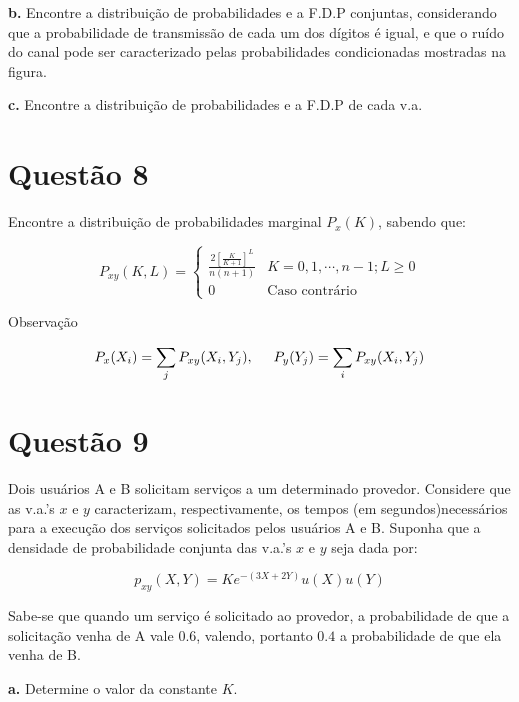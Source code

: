 \documentclass[a5paper]{report}
\begin{document}
\textbf{b.} Encontre a distribuição de probabilidades e a F.D.P conjuntas, considerando que a probabilidade de transmissão de cada um dos dígitos é igual, e que o ruído do canal pode ser caracterizado pelas probabilidades condicionadas mostradas na figura.

\textbf{c.} Encontre a distribuição de probabilidades e a F.D.P de cada v.a.


\section*{Questão 8}
Encontre a distribuição de probabilidades marginal $P_x(K)$, sabendo que:

\begin{equation*}
	P_{xy}(K, L) = 
	\begin{cases}
		\frac{2\left[\frac{K}{K + 1}\right]^L}{n(n + 1)} & K = 0, 1, \cdots, n - 1; L \geq 0\\
		0 \hspace{1cm}                                   & \text{Caso contrário} 
	\end{cases}
\end{equation*}

Observação

\[
	P_x(X_i) = 	\sum_{j} P_{xy}(X_i, Y_j), \hspace{0.5cm}
	P_y(Y_j) =  \sum_{i} P_{xy}(X_i, Y_j)
\]


\section*{Questão 9}
Dois usuários A e B solicitam serviços a um determinado provedor. Considere que as v.a.'s $x$ e $y$ caracterizam, respectivamente, os tempos (em segundos)necessários para a execução dos serviços solicitados pelos usuários A e B.
Suponha que a densidade de probabilidade conjunta das v.a.'s $x$ e $y$ seja dada por:

\[p_{xy}(X, Y) = Ke^{-(3X + 2Y)}u(X)u(Y)\]

Sabe-se que quando um serviço é solicitado ao provedor, a probabilidade de que
a solicitação venha de A vale $0.6$, valendo, portanto $0.4$ a probabilidade de que ela venha de B.

\textbf{a.} Determine o valor da constante $K$.
\end{document}
